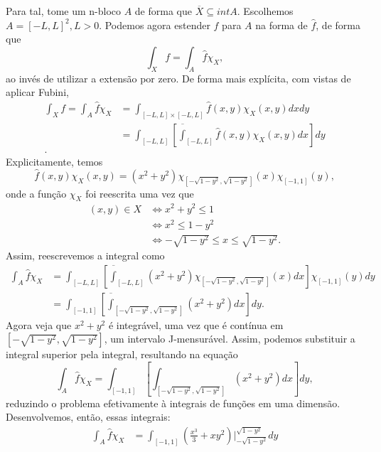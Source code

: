 \begin{eg}
    Para tal, tome um n-bloco $A$ de forma que $\overline{X}\subseteq int A$. Escolhemos $A = \left[ -L,L \right]^2 , L>0$. Podemos agora estender $f$ para $A$ na forma de $\hat{f}$, de forma que \[
    \int_X f = \int_A \hat{f} \chi_X
    ,\] ao invés de utilizar a extensão por zero. De forma mais explícita, com vistas de aplicar Fubini,
    \begin{align*}
	\int_X f = \int_A \hat{f} \chi_X &= \int_{\left[ -L,L \right] \times \left[ -L,L \right] } \hat{f}\left( x,y \right) \chi_X \left( x,y \right) dx dy \\
	&= \int_{\left[ -L,L \right] } \left[ \overline{\int}_{\left[ -L,L \right] }\hat{f}\left( x,y \right) \chi_X\left( x,y \right) dx \right] dy \\
    .\end{align*}
    Explicitamente, temos \[
	\hat{f}\left( x,y \right) \chi_X\left( x,y \right) = \left( x^2 + y^2 \right) \chi_{\left[ -\sqrt{1-y^2} , \sqrt{1-y^2}  \right] }\left( x \right) \chi_{[-1,1]}\left( y \right) \tag{$*$}
    ,\] onde a função $\chi_X$ foi reescrita uma vez que
    \begin{align*}
	\left( x,y \right) \in X &\iff x^2+y^2 \le 1 \\
				 &\iff x^2 \le 1-y^2 \\
				 &\iff -\sqrt{1-y^2} \le x\le \sqrt{1-y^2} 
    .\end{align*}
    Assim, reescrevemos a integral como
    \begin{align*}
	\int_A \hat{f} \chi_X &= \int_{\left[ -L,L \right] } \left[ \overline{\int}_{\left[ -L,L \right] } \left( x^2 + y^2 \right) \chi_{\left[ -\sqrt{1-y^2} , \sqrt{1-y^2}  \right] }\left( x \right) dx \right] \chi_{[-1,1]}\left( y \right) dy \\
	&= \int_{\left[ -1,1 \right] } \left[ \overline{\int}_{\left[ -\sqrt{1-y^2} , \sqrt{1-y^2}  \right] } \left( x^2 + y^2 \right) dx \right]  dy
    .\end{align*}
    Agora veja que $x^2 + y^2$ é integrável, uma vez que é contínua em $\left[ -\sqrt{1-y^2} , \sqrt{1-y^2}  \right] $, um intervalo J-mensurável. Assim, podemos substituir a integral superior pela integral, resultando na equação \[
	\int_A \hat{f} \chi_X= \int_{\left[ -1,1 \right] } \left[ \int_{\left[ -\sqrt{1-y^2} , \sqrt{1-y^2}  \right] } \left( x^2 + y^2 \right) dx \right]  dy
    ,\] reduzindo o problema efetivamente à integrais de funções em uma dimensão. Desenvolvemos, então, essas integrais:
    \begin{align*}
	\int_A \hat{f} \chi_X&= \int_{\left[ -1,1 \right] } \left( \frac{x^3}{3} + xy^2 \right)\Big|_{-\sqrt{1-y^2} }^{\sqrt{1-y^2} } dy \\

\end{align*}
\end{eg}
